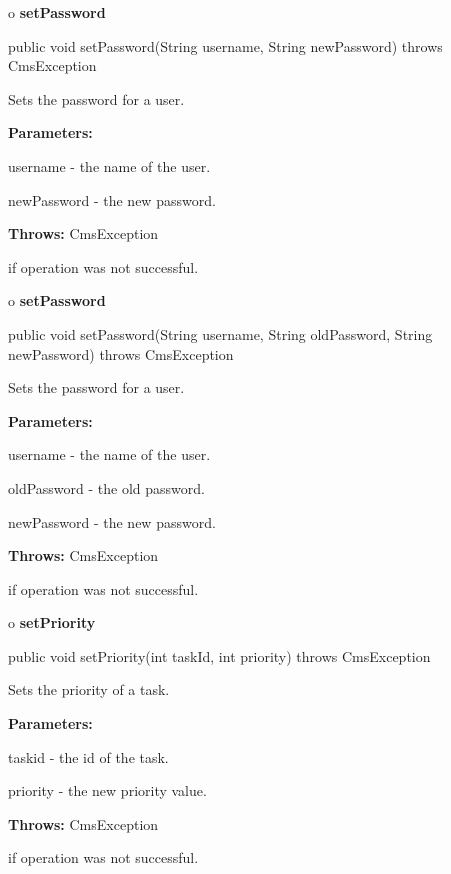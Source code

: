 o {\bf setPassword} 

\begin{PRE}
 public void setPassword(String username,
                         String newPassword) throws CmsException
\end{PRE}

\begin{description}
\htmlDD Sets the password for a user. 

\begin{description}
\item {\bf Parameters:}  

username - the name of the user.  

newPassword - the new password.  
\item {\bf Throws:} CmsException  

if operation was not successful.  
\end{description}

\end{description}

o {\bf setPassword} 

\begin{PRE}
 public void setPassword(String username,
                         String oldPassword,
                         String newPassword) throws CmsException
\end{PRE}

\begin{description}
\htmlDD Sets the password for a user. 

\begin{description}
\item {\bf Parameters:}  

username - the name of the user.  

oldPassword - the old password.  

newPassword - the new password.  
\item {\bf Throws:} CmsException  

if operation was not successful.  
\end{description}

\end{description}

o {\bf setPriority} 

\begin{PRE}
 public void setPriority(int taskId,
                         int priority) throws CmsException
\end{PRE}

\begin{description}
\htmlDD Sets the priority of a task. 

\begin{description}
\item {\bf Parameters:}  

taskid - the id of the task.  

priority - the new priority value.  
\item {\bf Throws:} CmsException  

if operation was not successful.  
\end{description}

\end{description}

